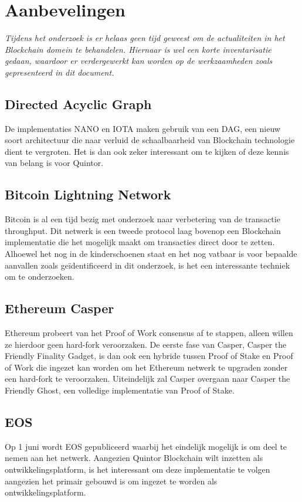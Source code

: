 \chapter{Aanbevelingen}

\textit{Tijdens het onderzoek is er helaas geen tijd geweest om de actualiteiten in het Blockchain domein te behandelen. Hiernaar is wel een korte inventarisatie gedaan, waardoor er verdergewerkt kan worden op de werkzaamheden zoals gepresenteerd in dit document.}

\section{Directed Acyclic Graph}

De implementaties NANO en IOTA maken gebruik van een \acrfull{DAG}, een nieuw soort architectuur die naar verluid de schaalbaarheid van Blockchain technologie dient te vergroten. Het is dan ook zeker interessant om te kijken of deze kennis van belang is voor Quintor.

\section{Bitcoin Lightning Network}

Bitcoin is al een tijd bezig met onderzoek naar verbetering van de transactie throughput. Dit netwerk is een tweede protocol laag bovenop een Blockchain implementatie die het mogelijk maakt om transacties direct door te zetten. Alhoewel het nog in de kinderschoenen staat en het nog vatbaar is voor bepaalde aanvallen zoals geïdentificeerd in dit onderzoek, is het een interessante techniek om te onderzoeken.

\section{Ethereum Casper}

Ethereum probeert van het Proof of Work consensus af te stappen, alleen willen ze hierdoor geen hard-fork veroorzaken. De eerste fase van Casper, Casper the Friendly Finality Gadget, is dan ook een hybride tussen Proof of Stake en Proof of Work die ingezet kan worden om het Ethereum netwerk te upgraden zonder een hard-fork te veroorzaken. Uiteindelijk zal Casper overgaan naar Casper the Friendly Ghost, een volledige implementatie van Proof of Stake.

\section{EOS}

Op 1 juni wordt EOS gepubliceerd waarbij het eindelijk mogelijk is om deel te nemen aan het netwerk. Aangezien Quintor Blockchain wilt inzetten als ontwikkelingsplatform, is het interessant om deze implementatie te volgen aangezien het primair gebouwd is om ingezet te worden als ontwikkelingsplatform.
